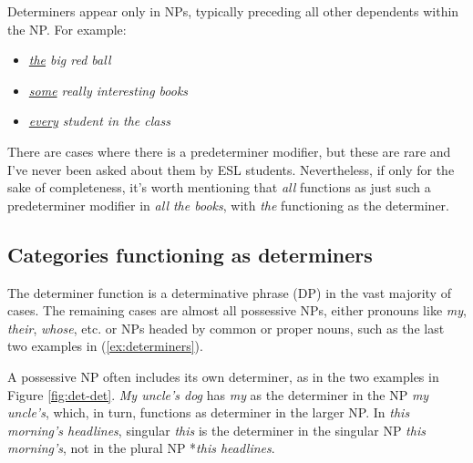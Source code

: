 Determiners appear only in NPs, typically preceding all other dependents within the NP. For example:

\begin{itemize}[noitemsep]
   \item \textit{\uline{the} big red ball}
   \item \textit{\uline{some} really interesting books}
   \item \textit{\uline{every} student in the class}
\end{itemize}

There are cases where there is a predeterminer modifier, but these are rare and I've never been asked about them by ESL students. Nevertheless, if only for the sake of completeness, it's worth mentioning that \textit{all} functions as just such a predeterminer modifier in \textit{all the books}, with \textit{the} functioning as the determiner.

\subsection{Categories functioning as determiners}

The determiner function is a determinative phrase (DP) in the vast majority of cases. The remaining cases are almost all possessive NPs, either pronouns like \textit{my}, \textit{their}, \textit{whose}, etc. or NPs headed by common or proper nouns, such as the last two examples in (\ref{ex:determiners}).

A possessive NP often includes its own determiner, as in the two examples in Figure \ref{fig:det-det}. \textit{My uncle's dog} has \textit{my} as the determiner in the NP \textit{my uncle's}, which, in turn, functions as determiner in the larger NP. In \textit{this morning's headlines}, singular \textit{this} is the determiner in the singular NP \textit{this morning's}, not in the plural NP *\textit{this headlines}.

